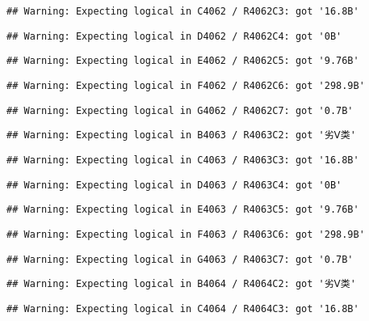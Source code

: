 \documentclass[
]{article}
\begin{document}
\begin{verbatim}
## Warning: Expecting logical in C4062 / R4062C3: got '16.8B'
\end{verbatim}

\begin{verbatim}
## Warning: Expecting logical in D4062 / R4062C4: got '0B'
\end{verbatim}

\begin{verbatim}
## Warning: Expecting logical in E4062 / R4062C5: got '9.76B'
\end{verbatim}

\begin{verbatim}
## Warning: Expecting logical in F4062 / R4062C6: got '298.9B'
\end{verbatim}

\begin{verbatim}
## Warning: Expecting logical in G4062 / R4062C7: got '0.7B'
\end{verbatim}

\begin{verbatim}
## Warning: Expecting logical in B4063 / R4063C2: got '劣Ⅴ类'
\end{verbatim}

\begin{verbatim}
## Warning: Expecting logical in C4063 / R4063C3: got '16.8B'
\end{verbatim}

\begin{verbatim}
## Warning: Expecting logical in D4063 / R4063C4: got '0B'
\end{verbatim}

\begin{verbatim}
## Warning: Expecting logical in E4063 / R4063C5: got '9.76B'
\end{verbatim}

\begin{verbatim}
## Warning: Expecting logical in F4063 / R4063C6: got '298.9B'
\end{verbatim}

\begin{verbatim}
## Warning: Expecting logical in G4063 / R4063C7: got '0.7B'
\end{verbatim}

\begin{verbatim}
## Warning: Expecting logical in B4064 / R4064C2: got '劣Ⅴ类'
\end{verbatim}

\begin{verbatim}
## Warning: Expecting logical in C4064 / R4064C3: got '16.8B'
\end{verbatim}
\end{document}
